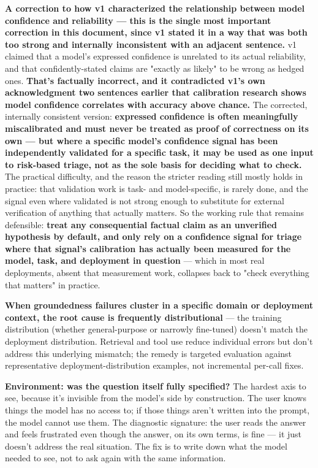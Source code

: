 \textbf{A correction to how v1 characterized the relationship between model confidence and reliability --- this is the single most important correction in this document, since v1 stated it in a way that was both too strong and internally inconsistent with an adjacent sentence.} v1 claimed that a model's expressed confidence is unrelated to its actual reliability, and that confidently-stated claims are "exactly as likely" to be wrong as hedged ones. \textbf{That's factually incorrect, and it contradicted v1's own acknowledgment two sentences earlier that calibration research shows model confidence correlates with accuracy above chance.} The corrected, internally consistent version: \textbf{expressed confidence is often meaningfully miscalibrated and must never be treated as proof of correctness on its own --- but where a specific model's confidence signal has been independently validated for a specific task, it may be used as one input to risk-based triage, not as the sole basis for deciding what to check.} The practical difficulty, and the reason the stricter reading still mostly holds in practice: that validation work is task- and model-specific, is rarely done, and the signal even where validated is not strong enough to substitute for external verification of anything that actually matters. So the working rule that remains defensible: \textbf{treat any consequential factual claim as an unverified hypothesis by default, and only rely on a confidence signal for triage where that signal's calibration has actually been measured for the model, task, and deployment in question} --- which in most real deployments, absent that measurement work, collapses back to "check everything that matters" in practice.

\textbf{When groundedness failures cluster in a specific domain or deployment context, the root cause is frequently distributional} --- the training distribution (whether general-purpose or narrowly fine-tuned) doesn't match the deployment distribution. Retrieval and tool use reduce individual errors but don't address this underlying mismatch; the remedy is targeted evaluation against representative deployment-distribution examples, not incremental per-call fixes.

\textbf{Environment: was the question itself fully specified?} The hardest axis to see, because it's invisible from the model's side by construction. The user knows things the model has no access to; if those things aren't written into the prompt, the model cannot use them. The diagnostic signature: the user reads the answer and feels frustrated even though the answer, on its own terms, is fine --- it just doesn't address the real situation. The fix is to write down what the model needed to see, not to ask again with the same information.

